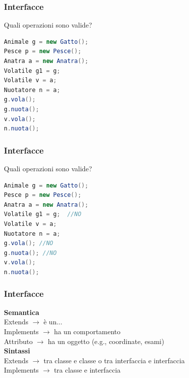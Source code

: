 \documentclass{beamer}
\begin{document}
\begin{frame}[fragile]
\frametitle{Interfacce}
Quali operazioni sono valide?
\begin{lstlisting}[language=Java,escapechar=|]
Animale g = new Gatto(); 
Pesce p = new Pesce(); 
Anatra a = new Anatra(); 
Volatile g1 = g; 
Volatile v = a;
Nuotatore n = a;
g.vola();
g.nuota();
v.vola();
n.nuota();
\end{lstlisting}
\end{frame}

\begin{frame}[fragile]
\frametitle{Interfacce}
Quali operazioni sono valide?
\begin{lstlisting}[language=Java,escapechar=|]
Animale g = new Gatto(); 
Pesce p = new Pesce(); 
Anatra a = new Anatra(); 
Volatile g1 = g;  //NO
Volatile v = a;
Nuotatore n = a;
g.vola(); //NO
g.nuota(); //NO
v.vola(); 
n.nuota(); 
\end{lstlisting}
\end{frame}


\begin{frame}[fragile]
\frametitle{Interfacce}
\textbf{Semantica}\\
Extends $\rightarrow$ \`e un...\\
Implements $\rightarrow$ ha un comportamento\\
Attributo $\rightarrow$ ha un oggetto (e.g., coordinate, esami) \\
\vspace{1cm}
\textbf{Sintassi}\\
Extends $\rightarrow$ tra classe e classe o tra interfaccia e interfaccia\\
Implements $\rightarrow$ tra classe e interfaccia\\
\end{frame}
\end{document}
